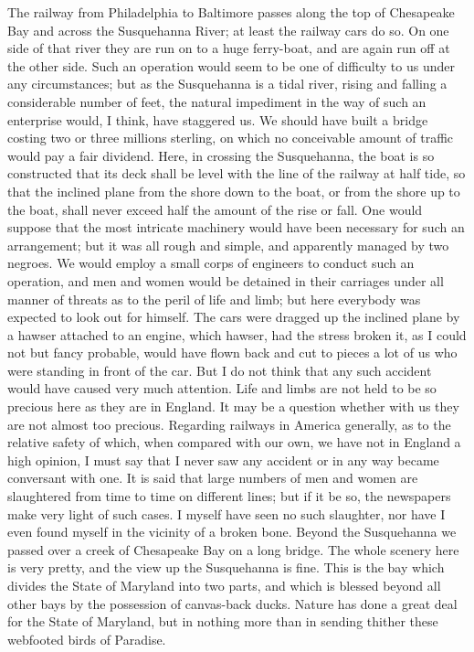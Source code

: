 The railway from Philadelphia to Baltimore passes along the top of
Chesapeake Bay and across the Susquehanna River; at least the
railway cars do so.  On one side of that river they are run on to a
huge ferry-boat, and are again run off at the other side.  Such an
operation would seem to be one of difficulty to us under any
circumstances; but as the Susquehanna is a tidal river, rising and
falling a considerable number of feet, the natural impediment in
the way of such an enterprise would, I think, have staggered us.
We should have built a bridge costing two or three millions
sterling, on which no conceivable amount of traffic would pay a
fair dividend.  Here, in crossing the Susquehanna, the boat is so
constructed that its deck shall be level with the line of the
railway at half tide, so that the inclined plane from the shore
down to the boat, or from the shore up to the boat, shall never
exceed half the amount of the rise or fall.  One would suppose that
the most intricate machinery would have been necessary for such an
arrangement; but it was all rough and simple, and apparently
managed by two negroes.  We would employ a small corps of engineers
to conduct such an operation, and men and women would be detained
in their carriages under all manner of threats as to the peril of
life and limb; but here everybody was expected to look out for
himself.  The cars were dragged up the inclined plane by a hawser
attached to an engine, which hawser, had the stress broken it, as I
could not but fancy probable, would have flown back and cut to
pieces a lot of us who were standing in front of the car.  But I do
not think that any such accident would have caused very much
attention.  Life and limbs are not held to be so precious here as
they are in England.  It may be a question whether with us they are
not almost too precious.  Regarding railways in America generally,
as to the relative safety of which, when compared with our own, we
have not in England a high opinion, I must say that I never saw any
accident or in any way became conversant with one.  It is said that
large numbers of men and women are slaughtered from time to time on
different lines; but if it be so, the newspapers make very light of
such cases.  I myself have seen no such slaughter, nor have I even
found myself in the vicinity of a broken bone.  Beyond the
Susquehanna we passed over a creek of Chesapeake Bay on a long
bridge.  The whole scenery here is very pretty, and the view up the
Susquehanna is fine.  This is the bay which divides the State of
Maryland into two parts, and which is blessed beyond all other bays
by the possession of canvas-back ducks.  Nature has done a great
deal for the State of Maryland, but in nothing more than in sending
thither these webfooted birds of Paradise.

